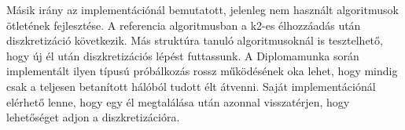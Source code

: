 Másik irány az implementációnál bemutatott, jelenleg nem használt algoritmusok ötletének fejlesztése. A referencia algoritmusban a k2-es élhozzáadás után diszkretizáció következik. Más struktúra tanuló algoritmusoknál is tesztelhető, hogy új él után diszkretizációs lépést futtassunk. A Diplomamunka során implementált ilyen típusú próbálkozás rossz működésének oka lehet, hogy mindig csak a teljesen betanított hálóból tudott élt átvenni. Saját implementációnál elérhető lenne, hogy egy él megtalálása után azonnal visszatérjen, hogy lehetőséget adjon a diszkretizációra.